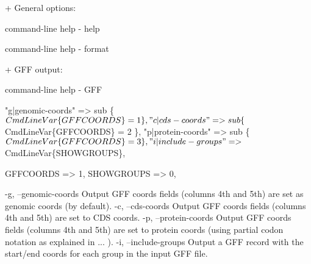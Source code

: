 \documentclass[11pt]{article}
\def\nwendcode{\endtrivlist \endgroup} %
\let\nwdocspar=\par                    %
\begin{document}
+ General options:

  \LA{}command-line help - help~{\nwtagstyle{}}\RA{}

  \LA{}command-line help - format~{\nwtagstyle{}}\RA{}

+ GFF output:

  \LA{}command-line help - GFF~{\nwtagstyle{}}\RA{}
\nwendcode{}\nwdocspar


\nwenddocs{}\endmoddef
"g|genomic-coords" => sub \{ $CmdLineVar\{GFFCOORDS\} = 1 \},
"c|cds-coords"     => sub \{ $CmdLineVar\{GFFCOORDS\} = 2 \},
"p|protein-coords" => sub \{ $CmdLineVar\{GFFCOORDS\} = 3 \},
"i|include-groups" => \\$CmdLineVar\{SHOWGROUPS\},
\nwendcode{}\nwdocspar
\nwenddocs{}\endmoddef
GFFCOORDS  => 1,
SHOWGROUPS => 0,
\nwendcode{}\nwdocspar
\nwenddocs{}\endmoddef
-g, --genomic-coords   Output GFF coords fields (columns 4th and 5th)
                       are set as genomic coords (by default).
-c, --cds-coords       Output GFF coords fields (columns 4th and 5th)
                       are set to CDS coords.
-p, --protein-coords   Output GFF coords fields (columns 4th and 5th)
                       are set to protein coords (using partial codon
                       notation as explained in ... ).
-i, --include-groups   Output a GFF record with the start/end coords
                       for each group in the input GFF file.
\nwendcode{}\nwdocspar

\label{todo:CAA}\label{todo:CAB}
\nwenddocs{}%
%
%
\nwdocspar
\nwenddocs{}%
%
%
\nwdocspar
\todo{ \item \todoCAA 
       \item \todoCAB } %
\end{document}
